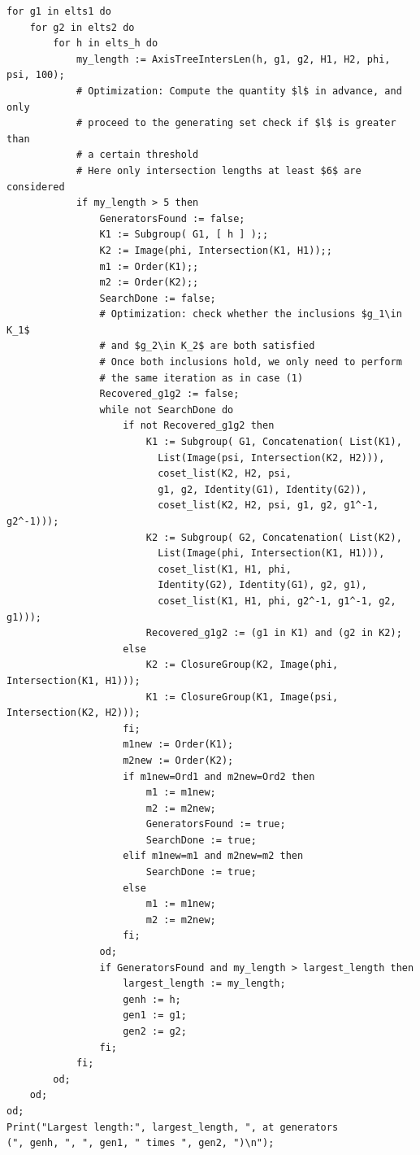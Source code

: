 \documentclass[12pt,leqno]{amsart}
\newcommand{\2}{L^2_{\rm per}(0, T)}
\numberwithin{equation}{section}
\numberwithin{figure}{section}
\begin{document}
\begin{verbatim}
for g1 in elts1 do
    for g2 in elts2 do
        for h in elts_h do
            my_length := AxisTreeIntersLen(h, g1, g2, H1, H2, phi, psi, 100);
            # Optimization: Compute the quantity $l$ in advance, and only
            # proceed to the generating set check if $l$ is greater than 
            # a certain threshold
            # Here only intersection lengths at least $6$ are considered
            if my_length > 5 then
                GeneratorsFound := false;
                K1 := Subgroup( G1, [ h ] );;
                K2 := Image(phi, Intersection(K1, H1));;
                m1 := Order(K1);;
                m2 := Order(K2);;
                SearchDone := false;
                # Optimization: check whether the inclusions $g_1\in K_1$
                # and $g_2\in K_2$ are both satisfied
                # Once both inclusions hold, we only need to perform 
                # the same iteration as in case (1)
                Recovered_g1g2 := false;
                while not SearchDone do
                    if not Recovered_g1g2 then
                        K1 := Subgroup( G1, Concatenation( List(K1),
                          List(Image(psi, Intersection(K2, H2))),
                          coset_list(K2, H2, psi, 
                          g1, g2, Identity(G1), Identity(G2)), 
                          coset_list(K2, H2, psi, g1, g2, g1^-1, g2^-1)));
                        K2 := Subgroup( G2, Concatenation( List(K2), 
                          List(Image(phi, Intersection(K1, H1))),
                          coset_list(K1, H1, phi, 
                          Identity(G2), Identity(G1), g2, g1),
                          coset_list(K1, H1, phi, g2^-1, g1^-1, g2, g1)));
                        Recovered_g1g2 := (g1 in K1) and (g2 in K2);
                    else
                        K2 := ClosureGroup(K2, Image(phi, Intersection(K1, H1)));
                        K1 := ClosureGroup(K1, Image(psi, Intersection(K2, H2)));
                    fi;
                    m1new := Order(K1);
                    m2new := Order(K2);
                    if m1new=Ord1 and m2new=Ord2 then
                        m1 := m1new;
                        m2 := m2new;
                        GeneratorsFound := true;
                        SearchDone := true;
                    elif m1new=m1 and m2new=m2 then
                        SearchDone := true;
                    else
                        m1 := m1new;
                        m2 := m2new;
                    fi;
                od;
                if GeneratorsFound and my_length > largest_length then
                    largest_length := my_length;
                    genh := h;
                    gen1 := g1;
                    gen2 := g2;
                fi;
            fi;
        od;
    od;
od;
Print("Largest length:", largest_length, ", at generators
(", genh, ", ", gen1, " times ", gen2, ")\n");
\end{verbatim}
\end{document}
